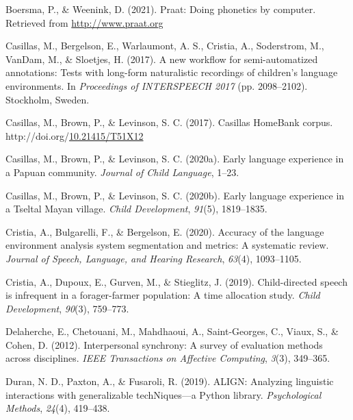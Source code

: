 \documentclass[10pt, letterpaper]{article}
\newenvironment{CSLReferences}%
  {}%
  {\par}
\begin{document}
\setlength{\parindent}{-0.1in} 
\setlength{\leftskip}{0.125in}

\noindent

\hypertarget{refs}{}
\begin{CSLReferences}
\leavevmode\hypertarget{ref-PRAAT}{}%
Boersma, P., \& Weenink, D. (2021). Praat: Doing phonetics by computer.
Retrieved from \url{http://www.praat.org}

\leavevmode\hypertarget{ref-casillas2017workflow}{}%
Casillas, M., Bergelson, E., Warlaumont, A. S., Cristia, A., Soderstrom,
M., VanDam, M., \& Sloetjes, H. (2017). A new workflow for
semi-automatized annotations: Tests with long-form naturalistic
recordings of children's language environments. In \emph{Proceedings of
{INTERSPEECH} 2017} (pp. 2098--2102). Stockholm, Sweden.

\leavevmode\hypertarget{ref-Casillas-HB}{}%
Casillas, M., Brown, P., \& Levinson, S. C. (2017). Casillas {HomeBank}
corpus.
http://doi.org/\href{https://doi.org/10.21415/T51X12}{10.21415/T51X12}

\leavevmode\hypertarget{ref-casillas2020rossel}{}%
Casillas, M., Brown, P., \& Levinson, S. C. (2020a). Early language
experience in a {P}apuan community. \emph{Journal of Child Language},
1--23.

\leavevmode\hypertarget{ref-casillas2020tseltal}{}%
Casillas, M., Brown, P., \& Levinson, S. C. (2020b). Early language
experience in a {Tseltal Mayan} village. \emph{Child Development},
\emph{91}(5), 1819--1835.

\leavevmode\hypertarget{ref-cristia2020accuracy}{}%
Cristia, A., Bulgarelli, F., \& Bergelson, E. (2020). Accuracy of the
language environment analysis system segmentation and metrics: A
systematic review. \emph{Journal of Speech, Language, and Hearing
Research}, \emph{63}(4), 1093--1105.

\leavevmode\hypertarget{ref-cristia2019child}{}%
Cristia, A., Dupoux, E., Gurven, M., \& Stieglitz, J. (2019).
Child-directed speech is infrequent in a forager-farmer population: A
time allocation study. \emph{Child Development}, \emph{90}(3), 759--773.

\leavevmode\hypertarget{ref-delaherche2012interpersonal}{}%
Delaherche, E., Chetouani, M., Mahdhaoui, A., Saint-Georges, C., Viaux,
S., \& Cohen, D. (2012). Interpersonal synchrony: A survey of evaluation
methods across disciplines. \emph{IEEE Transactions on Affective
Computing}, \emph{3}(3), 349--365.

\leavevmode\hypertarget{ref-duran2019align}{}%
Duran, N. D., Paxton, A., \& Fusaroli, R. (2019). ALIGN: Analyzing
linguistic interactions with generalizable techNiques---a {P}ython
library. \emph{Psychological Methods}, \emph{24}(4), 419--438.


\end{CSLReferences}
\end{document}

